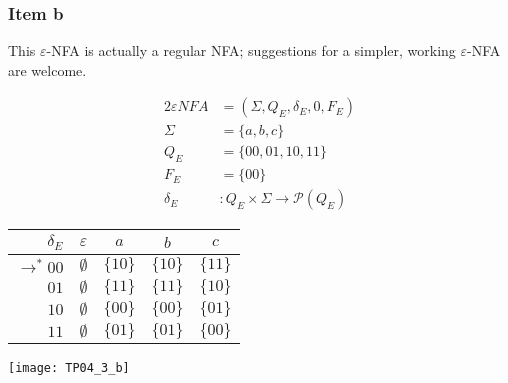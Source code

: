 {\subsubsection{Item b}
This $\varepsilon$-NFA is actually a regular NFA; suggestions for a simpler, working $\varepsilon$-NFA are welcome.
\begin{center}
	\begin{minipage}[c]{0.27\textwidth}
		\begin{alignat*}{2}
			\varepsilon NFA &= (\Sigma, Q_E, \delta_E, 0, F_E)\\
			\Sigma &= \{a,b,c\}\\
			Q_E    &= \{00,01,10,11\}\\
			F_E    &= \{00\}\\
			\delta_E &\colon Q_E \times \Sigma \rightarrow \mathscr{P}(Q_E)
		\end{alignat*}
	\end{minipage}
	\begin{minipage}[c]{0.35\textwidth}
		\begin{center}
		\begin{tabular}{ r | c c c c }
 			$\delta_E           $ & $\varepsilon$ & $a    $ & $b    $ & $c$ \\ \hline
 			$\rightarrow^\ast 00$ & $\emptyset  $ & $\{10\}$ & $\{10\}$ & $\{11\}$ \\  
 			$                 01$ & $\emptyset  $ & $\{11\}$ & $\{11\}$ & $\{10\}$ \\
 			$                 10$ & $\emptyset  $ & $\{00\}$ & $\{00\}$ & $\{01\}$\\
 			$                 11$ & $\emptyset  $ & $\{01\}$ & $\{01\}$ & $\{00\}$
		\end{tabular}
		\end{center}
	\end{minipage}
	\begin{minipage}[c]{0.37\textwidth}
		\begin{center} \texttt{[image: TP04\_3\_b]} \end{center}
	\end{minipage}
\end{center}
}
